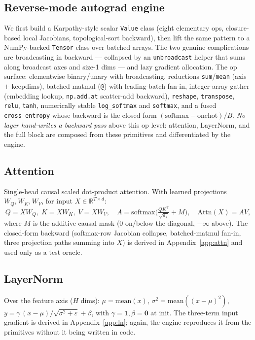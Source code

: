 \documentclass{article}
\begin{document}
\subsection{Reverse-mode autograd engine} We first build a Karpathy-style scalar \texttt{Value} class (eight elementary ops, closure-based local Jacobians, topological-sort backward), then lift the same pattern to a NumPy-backed \texttt{Tensor} class over batched arrays. The two genuine complications are broadcasting in backward — collapsed by an \texttt{unbroadcast} helper that sums along broadcast axes and size-1 dims — and lazy gradient allocation. The op surface: elementwise binary/unary with broadcasting, reductions \texttt{sum}/\texttt{mean} (axis $+$ keepdims), batched matmul (\texttt{@}) with leading-batch fan-in, integer-array gather (embedding lookup, \texttt{np.add.at} scatter-add backward), \texttt{reshape}, \texttt{transpose}, \texttt{relu}, \texttt{tanh}, numerically stable \texttt{log\_softmax} and \texttt{softmax}, and a fused \texttt{cross\_entropy} whose backward is the closed form $(\mathrm{softmax}-\text{onehot})/B$. \emph{No layer hand-writes a backward pass} above this op level: attention, LayerNorm, and the full block are composed from these primitives and differentiated by the engine.

\subsection{Attention} Single-head causal scaled dot-product attention. With learned projections $W_Q,W_K,W_V$, for input $X\in\mathbb R^{T\times d}$:
\[
Q=XW_Q,\;K=XW_K,\;V=XW_V,\quad
A=\mathrm{softmax}\!\Big(\tfrac{QK^\top}{\sqrt{d_k}}+M\Big),\quad
\mathrm{Attn}(X)=AV,
\]
where $M$ is the additive causal mask ($0$ on/below the diagonal, $-\infty$ above). The closed-form backward (softmax-row Jacobian collapse, batched-matmul fan-in, three projection paths summing into $X$) is derived in Appendix~\ref{app:attn} and used only as a test oracle.

\subsection{LayerNorm} Over the feature axis ($H$ dims): $\mu=\mathrm{mean}(x)$, $\sigma^2=\mathrm{mean}((x-\mu)^2)$, $y=\gamma\,(x-\mu)/\sqrt{\sigma^2+\varepsilon}+\beta$, with $\gamma=\mathbf 1,\beta=\mathbf 0$ at init. The three-term input gradient is derived in Appendix~\ref{app:ln}; again, the engine reproduces it from the primitives without it being written in code.
\end{document}
